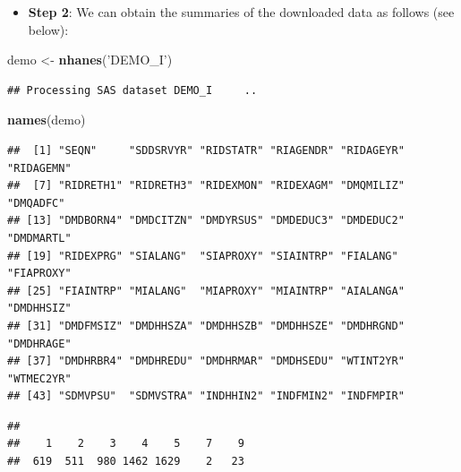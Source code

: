 \documentclass[
]{book}
\newenvironment{Shaded}{\begin{snugshade}}{\end{snugshade}}
\newcommand{\KeywordTok}[1]{\textcolor[rgb]{0.13,0.29,0.53}{\textbf{#1}}}
\newcommand{\NormalTok}[1]{#1}
\newcommand{\OperatorTok}[1]{\textcolor[rgb]{0.81,0.36,0.00}{\textbf{#1}}}
\newcommand{\StringTok}[1]{\textcolor[rgb]{0.31,0.60,0.02}{#1}}
\providecommand{\tightlist}{%
  \setlength{\itemsep}{0pt}\setlength{\parskip}{0pt}}
\begin{document}
\begin{itemize}
\tightlist
\item
  \textbf{Step 2}: We can obtain the summaries of the downloaded data as follows (see below):
\end{itemize}

\begin{Shaded}
\begin{Highlighting}[]
\NormalTok{demo <-}\StringTok{ }\KeywordTok{nhanes}\NormalTok{(}\StringTok{'DEMO_I'}\NormalTok{)}
\end{Highlighting}
\end{Shaded}

\begin{verbatim}
## Processing SAS dataset DEMO_I 	 ..
\end{verbatim}

\begin{Shaded}
\begin{Highlighting}[]
\KeywordTok{names}\NormalTok{(demo)}
\end{Highlighting}
\end{Shaded}

\begin{verbatim}
##  [1] "SEQN"     "SDDSRVYR" "RIDSTATR" "RIAGENDR" "RIDAGEYR" "RIDAGEMN"
##  [7] "RIDRETH1" "RIDRETH3" "RIDEXMON" "RIDEXAGM" "DMQMILIZ" "DMQADFC" 
## [13] "DMDBORN4" "DMDCITZN" "DMDYRSUS" "DMDEDUC3" "DMDEDUC2" "DMDMARTL"
## [19] "RIDEXPRG" "SIALANG"  "SIAPROXY" "SIAINTRP" "FIALANG"  "FIAPROXY"
## [25] "FIAINTRP" "MIALANG"  "MIAPROXY" "MIAINTRP" "AIALANGA" "DMDHHSIZ"
## [31] "DMDFMSIZ" "DMDHHSZA" "DMDHHSZB" "DMDHHSZE" "DMDHRGND" "DMDHRAGE"
## [37] "DMDHRBR4" "DMDHREDU" "DMDHRMAR" "DMDHSEDU" "WTINT2YR" "WTMEC2YR"
## [43] "SDMVPSU"  "SDMVSTRA" "INDHHIN2" "INDFMIN2" "INDFMPIR"
\end{verbatim}

\begin{Shaded}
\end{Shaded}

\begin{verbatim}
## 
##    1    2    3    4    5    7    9 
##  619  511  980 1462 1629    2   23
\end{verbatim}

\begin{Shaded}
\end{Shaded}
\end{document}
